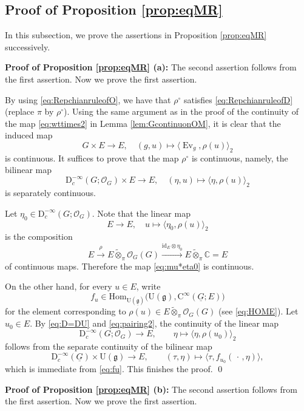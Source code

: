 \documentclass[12pt, a4paper]{amsart}
\newcommand{\BC}{{\mathbb {C}}}
\newcommand{\CO}{{\mathcal {O}}}
\newcommand{\RC}{{\mathrm {C}}}
\newcommand{\RD}{{\mathrm {D}}}
\newcommand{\RU}{{\mathrm {U}}}
\newcommand{\Hom}{{\mathrm{Hom}}}
\newcommand{\wt}{\widetilde}
\newcommand{\Ev}{\operatorname{Ev}}
\newcommand{\g}{\mathfrak g}
\newcommand{\la}{\langle}
\newcommand{\ra}{\rangle}
\newcommand{\be}{\begin {equation}}
\newcommand{\ee}{\end {equation}}
\theoremstyle{Theorem}
\theoremstyle{Theorem}
\theoremstyle{Theorem}
\theoremstyle{Theorem}
\theoremstyle{Plain}
\theoremstyle{remark}
\theoremstyle{remark}
\theoremstyle{Definition}
\numberwithin{equation}{section}
\begin{document}
\subsection{Proof of Proposition \ref{prop:eqMR}} In this subsection, we prove the assertions in Proposition \ref{prop:eqMR} successively.

\noindent\textbf{Proof of Proposition \ref{prop:eqMR} (a):}
 The second assertion follows from the first assertion. Now we prove the first assertion. 
 
 By using \eqref{eq:RepchianruleofO}, we have that $\rho^{\circ}$ satisfies  \eqref{eq:RepchianruleofD} (replace $\pi$ by $\rho^{\circ}$). 
Using the same argument as in the proof of the continuity of the map \eqref{eq:wttimes2} in Lemma \ref{lem:GcontinuonOM}, it is clear that the induced map  \be\label{eq:GonEfunctor2} G\times E\rightarrow E, \quad (g,u)\mapsto \la \Ev_g,\rho(u)\ra_2\ee is continuous.
It suffices to prove that the map $\rho^{\circ}$ is continuous, 
namely, the bilinear map 
        \be \label{eq:mu*2} \RD^{-\infty}_c(G;\CO_G)\times E\rightarrow E,\quad  (\eta, u)\mapsto \la\eta,\rho(u)\ra_2\ee
 is separately continuous. 
        
        Let $\eta_0\in \RD^{-\infty}_c(G;\CO_G)$.
        Note that the 
        linear map \be\label{eq:mu*eta0} E\rightarrow E,\quad u\mapsto \la\eta_0,\rho(u) \ra_2\ee is the   composition 
        \[E\xrightarrow{\rho}E\wt\otimes_{\pi}\CO_G(G)\xrightarrow{\mathrm{id}_{E}\otimes\eta_0}E\wt\otimes_{\pi}\BC=E\] of continuous maps.  Therefore the map \eqref{eq:mu*eta0} is continuous.

On the other hand, for every $u\in E$, 
write 
\be\label{eq:fu}
f_{u}\in
\Hom_{\RU(\underline{\g})}
\bigl(\RU(\g),\RC^\infty(\underline G;E)\bigr)
\ee for the element 
corresponding to $\rho(u)\in E\wt\otimes_{\pi}\CO_G(G)$ (see \eqref{eq:HOME}). Let $u_0\in E$. By \eqref{eq:D=DU} and \eqref{eq:pairing2}, the continuity of the linear map 
\[
\RD^{-\infty}_c(G;\CO_G)\rightarrow E,
\qquad
\eta\mapsto\la\eta,\rho(u_0)\ra_2
\]
follows from the separate continuity of the bilinear map 
\[
\RD^{-\infty}_c(\underline G)\times\RU(\g)\longrightarrow E,
\qquad
(\tau,\eta)\longmapsto
\la\tau,f_{u_0}(\,\cdot\,,\eta)\ra,
\]
which is immediate from \eqref{eq:fu}. This finishes the proof.
\qed

 

\vspace{3mm}


\noindent\textbf{Proof of Proposition \ref{prop:eqMR} (b):}
The second assertion follows from the first assertion. Now we prove the first assertion. 
\end{document}
